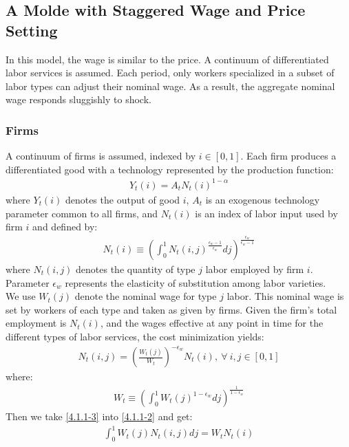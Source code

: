 \documentclass{article}
\numberwithin{equation}{section}
\begin{document}
\subsection{A Molde with Staggered Wage and Price Setting}
In this model, the wage is similar to the price. A continuum of differentiated labor services is assumed. Each period, only workers specialized in a subset of labor types can adjust their nominal wage. As a result, the aggregate nominal wage responds sluggishly to shock.

\subsubsection{Firms}
A continuum of firms is assumed, indexed by $i \in [0, 1]$. Each firm produces a differentiated good with a technology represented by the production function:
	\begin{align}
		Y_t(i) = A_t N_t(i)^{1 - \alpha} \label{4.1.1-1}
	\end{align}   
where $Y_t(i)$ denotes the output of good $i$, $A_t$ is an exogenous technology parameter common to all firms, and $N_t(i)$ is an index of labor input used by firm $i$ and defined by:
	\begin{align}
		N_t(i) \equiv \left( \int^1_0 N_t(i, j)^{\frac{\epsilon_w-1}{\epsilon_w}} dj \right)^{\frac{\epsilon_w}{\epsilon_w-1}} \label{4.1.1-2}
	\end{align}
where $N_t(i, j)$ denotes the quantity of type $j$ labor employed by firm $i$. Parameter $\epsilon_w$ represents the elasticity of substitution among labor varieties.\\
We use $W_t(j)$ denote the nominal wage for type $j$ labor. This nominal wage is set by workers of each type and taken as given by firms. Given the firm's total employment is $N_t(i)$, and the wages effective at any point in time for the different types of labor services, the cost minimization yields:
	\begin{align}
		N_t(i, j) = \left( \frac{W_t(j)}{W_t} \right)^{-\epsilon_w} N_t(i),\ \forall\ i, j \in[0, 1] \label{4.1.1-3}
	\end{align}
where:
	\begin{align*}
		W_t \equiv \left( \int^1_0 W_t(j)^{1-\epsilon_w} dj \right)^\frac{1}{1-\epsilon_w}
	\end{align*}
Then we take \eqref{4.1.1-3} into \eqref{4.1.1-2} and get:
	\begin{align*}
		\int^1_0 W_t(j)N_t(i, j) dj = W_t N_t(i)
	\end{align*}
\end{document}
